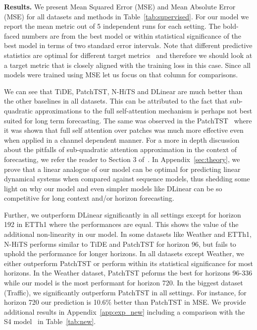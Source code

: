 \documentclass[10pt]{article} \usepackage[accepted]{tmlr}
\theoremstyle{plain}
\theoremstyle{definition}
\theoremstyle{remark}
\newcommand{\rev}[1]{#1}
\newcommand{\ours}{TiDE}
\begin{document}
{\bf Results. } We present Mean Squared Error (MSE) and Mean Absolute Error (MSE) for all datasets and methods in Table~\ref{tab:supervised}. For our model we report the mean metric out of 5 independent runs for each setting. The bold-faced numbers are from the best model or within statistical significance of the best model in terms of two standard error intervals. Note that different predictive statistics are optimal for different target metrics~\citep{awasthibenefits, gneiting2011making} and therefore we should look at a target metric that is closely aligned with the training loss in this case. Since all models were trained using MSE let us focus on that column for comparisons. 

We can see that \ours, PatchTST, N-HiTS and DLinear are much better than the other baselines in all datasets. \rev{This can be attributed to the fact that sub-quadratic approximations to the full self-attention mechanism is perhaps not best suited for long term forecasting. The same was observed in the PatchTST~\citep{nie2022time} where it was shown that full self attention over patches was much more effective even when applied in a channel dependent manner. For a more in depth discussion about the pitfalls of sub-quadratic attention approximation in the context of forecasting, we refer the reader to Section 3 of~\citep{zeng2022transformers}.} In Appendix~\ref{sec:theory}, we prove that a linear analogue of our model can be optimal for predicting linear dynamical systems when compared against sequence models, thus shedding some light on why our model and even simpler models like DLinear can be so competitive for long context and/or horizon forecasting.

Further, we outperform DLinear  significantly  in all settings except for horizon 192 in ETTh1 where the performances are equal. This shows the value of the additional non-linearity in our model. In some datasets like Weather and ETTh1, N-HiTS performs similar to TiDE and PatchTST for horizon 96, but fails to uphold the performance for longer horizons.
In all datasets except Weather, we either outperform PatchTST or perform within its statistical significance for most horizons. In the Weather dataset, PatchTST peforms the best for horizons 96-336 while our model is the most performant for horizon 720. In the biggest dataset (Traffic), we significantly outperform PatchTST in all settings. For instance, for horizon 720 our prediction is 10.6\% better than PatchTST in  MSE. \rev{We provide additional results in Appendix~\ref{app:exp_new} including a comparison with the S4 model~\citep{guefficiently} in Table~\ref{tab:new}.}
\end{document}
